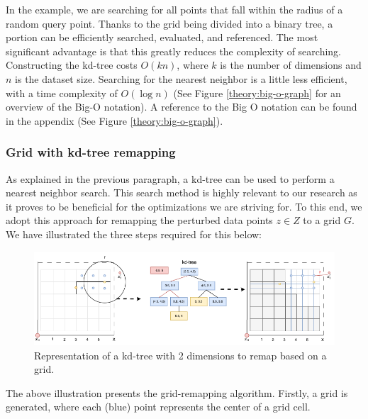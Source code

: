 In the example, we are searching for all points that fall within the radius of a random query point.
Thanks to the grid being divided into a binary tree, a portion can be efficiently searched, evaluated, and referenced.
The most significant advantage is that this greatly reduces the complexity of searching.
Constructing the kd-tree costs $O(kn)$, where $k$ is the number of dimensions and $n$ is the dataset size.
Searching for the nearest neighbor is a little less efficient, with a time complexity of $O(\log n)$ \citep{washington_k-d_2002} (See Figure \ref{theory:big-o-graph} for an overview of the Big-O notation).
A reference to the Big O notation can be found in the appendix (See Figure \ref{theory:big-o-graph}).
\subsubsection{Grid with kd-tree remapping} \label{theory:grid-remapping}
As explained in the previous paragraph, a kd-tree can be used to perform a nearest neighbor search.
This search method is highly relevant to our research as it proves to be beneficial for the optimizations we are striving for.
To this end, we adopt this approach for remapping the perturbed data points $z \in Z$ to a grid $G$. \newline
We have illustrated the three steps required for this below:
\begin{figure}[H]
  \includegraphics[width=1\textwidth]{TheorethicalFramework/ND-Laplace/Images/KD-tree.png}
  \caption{Representation of a kd-tree with 2 dimensions to remap based on a grid.}
  \label{fig:kd-tree}
\end{figure}
The above illustration presents the grid-remapping algorithm.
Firstly, a grid is generated, where each (blue) point represents the center of a grid cell.
